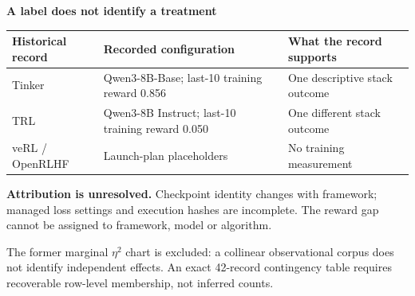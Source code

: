 \documentclass[border=8pt]{standalone}
\begin{document}
\begin{minipage}{15.2cm}\sffamily\small
{\Large\bfseries\color{ink} A label does not identify a treatment}\par\medskip
\begin{tabular}{@{}p{3cm}p{5.9cm}p{5.4cm}@{}}\toprule
Historical record & Recorded configuration & What the record supports\\\midrule
Tinker & Qwen3-8B-Base; last-10 training reward 0.856 & One descriptive stack outcome\\[5pt]
TRL & Qwen3-8B Instruct; last-10 training reward 0.050 & One different stack outcome\\[5pt]
veRL / OpenRLHF & Launch-plan placeholders & No training measurement\\\bottomrule
\end{tabular}\par\medskip
\colorbox{accent!10}{\parbox{14.6cm}{\textbf{Attribution is unresolved.} Checkpoint identity changes with framework; managed loss settings and execution hashes are incomplete. The reward gap cannot be assigned to framework, model or algorithm.}}
\par\medskip
The former marginal $\eta^2$ chart is excluded: a collinear observational corpus does not identify independent effects. An exact 42-record contingency table requires recoverable row-level membership, not inferred counts.
\end{minipage}
\end{document}
